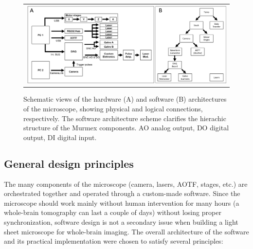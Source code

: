 \documentclass[12pt]{spieman}  %
\begin{document}
	\begin{figure}
   \begin{center}
   \begin{tabular}{c}
   \includegraphics[width=\textwidth]{connectivity.eps}
   \end{tabular}
   \end{center}
   \caption{\label{fig:connectivity} Schematic views of the hardware (A) and software (B) architectures of the microscope, showing physical and logical connections, respectively. The software architecture scheme clarifies the hierachic structure of the Murmex components. AO analog output, DO digital output, DI digital input.} 
   \end{figure}





\subsection{General design principles}

The many components of the microscope (camera, lasers, AOTF, stages, etc.) are orchestrated together and operated through a custom-made software. Since the microscope should work mainly without human intervention for many hours (a whole-brain tomography can last a couple of days) without losing proper synchronization, software design is not a secondary issue when building a light sheet microscope for whole-brain imaging. The overall architecture of the software and its practical implementation were chosen to satisfy several principles:
\end{document}

